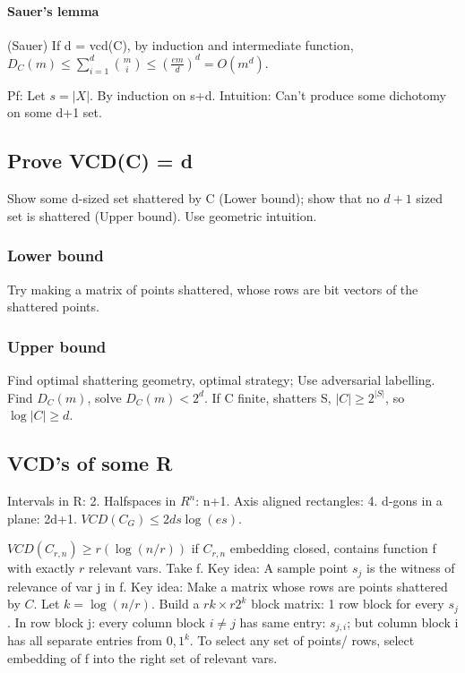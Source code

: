\documentclass[oneside, article]{memoir}
\begin{document}
\paragraph{Sauer's lemma}
(Sauer) If d = vcd(C), by induction and intermediate function, \\
$D_{C}(m) \leq \sum_{i=1}^{d} \binom{m}{i} \leq (\frac{em}{d})^{d} = O(m^{d})$.

Pf: Let $s = |X|$. By induction on s+d. \why Intuition: Can't produce some dichotomy on some d+1 set.


\subsection{Prove VCD(C) = d}
Show some d-sized set shattered by C (Lower bound); show that no $d+1$ sized set is shattered (Upper bound). Use geometric intuition.

\subsubsection{Lower bound}
Try making a matrix of points shattered, whose rows are bit vectors of the shattered points.

\subsubsection{Upper bound}
Find optimal shattering geometry, optimal strategy; Use adversarial labelling. Find $D_{C}(m)$, solve $D_{C}(m)<2^{d}$. If C finite, shatters S, $|C| \geq 2^{|S|}$, so $\log |C| \geq d$.

\subsection{VCD's of some R}
Intervals in R: 2. Halfspaces in $R^{n}$: n+1. Axis aligned rectangles: 4. d-gons in a plane: 2d+1. $VCD(C_{G}) \leq 2ds\log(es)$.

$VCD(C_{r,n}) \geq r(\log (n/r))$ if $C_{r, n}$ embedding closed, contains function f with exactly $r$ relevant vars. Take f. Key idea: A sample point $s_{j}$ is the witness of relevance of var j in f. Key idea: Make a matrix whose rows are points shattered by $C$. Let $k = \log (n/r)$. Build a $rk \times r2^k$ block matrix: 1 row block for every $s_{j}$. In row block j: every column block $i \neq j$ has same entry: $s_{j,i}$; but column block i has all separate entries from ${0,1}^k$. To select any set of points/ rows, select embedding of f into the right set of relevant vars.
\end{document}
